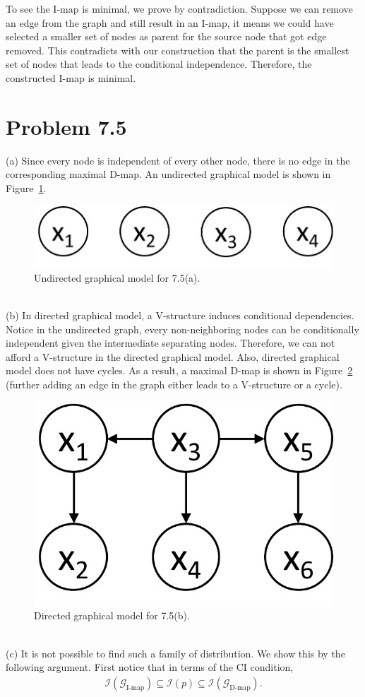\documentclass{article}
\newcommand{\qeds}{\hfill\qedsymbol}
\begin{document}
To see the I-map is minimal, we prove by contradiction. Suppose we can remove an edge from the graph and
still result in an I-map, it means we could have selected a smaller set of nodes as parent for the source
node that got edge removed. This contradicts with our construction that the parent is the smallest set of
nodes that leads to the conditional independence. Therefore, the constructed I-map is minimal. \qeds


\pagebreak
\section*{Problem 7.5}
(a)
%
Since every node is independent of every other node, there is no edge in the corresponding maximal D-map. An undirected graphical model is shown in Figure~\ref{f:75a}.
%
\begin{figure}[h!]
  \centering
  \includegraphics[width=0.3\columnwidth]{75a.pdf}
    \vspace{-0.1cm}
  \caption{Undirected graphical model for 7.5(a).}
  \label{f:75a}
\end{figure}
\\

\noindent
(b)
%
In directed graphical model, a V-structure induces conditional dependencies. Notice in the undirected graph, every non-neighboring nodes can be conditionally independent given the intermediate separating nodes. Therefore, we can not afford a V-structure in the directed graphical model. Also, directed graphical model does not have cycles. As a result, a maximal D-map is shown in Figure~\ref{f:75b} (further adding an edge in the graph either leads to a V-structure or a cycle).
%
\begin{figure}[h!]
  \centering
  \includegraphics[width=0.225\columnwidth]{75b.pdf}
    \vspace{-0.1cm}
  \caption{Directed graphical model for 7.5(b).}
  \label{f:75b}
\end{figure}
\\

\noindent
(c)
%
It is not possible to find such a family of distribution. We show this by the following argument. First notice
that in terms of the CI condition, 
\begin{align*}
	\mathscr{I}(\mathscr{G}_{\text{I-map}}) \subseteq \mathscr{I}(p) \subseteq \mathscr{I}(\mathscr{G}_{\text{D-map}}).
\end{align*}
\end{document}
